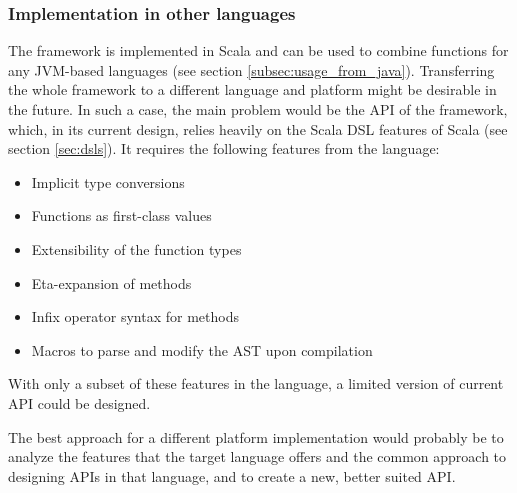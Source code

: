 \subsubsection{Implementation in other languages}

The framework is implemented in Scala and can be used to combine functions for any JVM-based languages (see section \ref{subsec:usage_from_java}). Transferring the whole framework to a different language and platform might be desirable in the future. In such a case, the main problem would be the API of the framework, which, in its current design, relies heavily on the Scala DSL features of Scala (see section \ref{sec:dsls}). It requires the following features from the language:

\begin{itemize}
	\item Implicit type conversions
	\item Functions as first-class values
	\item Extensibility of the function types
	\item Eta-expansion of methods
	\item Infix operator syntax for methods
	\item Macros to parse and modify the AST upon compilation
\end{itemize}

With only a subset of these features in the language, a limited version of current API could be designed. 

The best approach for a different platform implementation would probably be to analyze the features that the target language offers and the common approach to designing APIs in that language, and to create a new, better suited API.